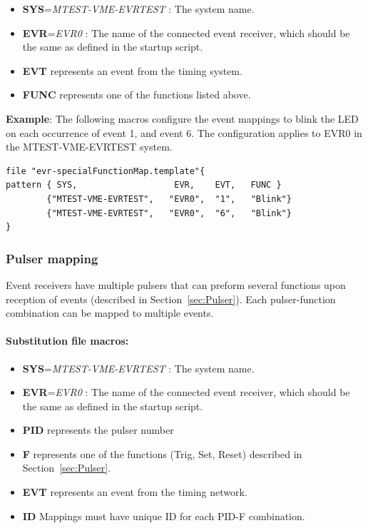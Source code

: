 \documentclass[12pt,a4paper]{article}
\begin{document}
\begin{itemize}
\item
	\textbf{SYS}=\emph{MTEST-VME-EVRTEST} : The system name. 
\item
	\textbf{EVR}=\emph{EVR0} : The name of the connected event receiver, which should be the same as defined in the startup script. 
\item
  \textbf{EVT} represents an event from the timing system.
\item
  \textbf{FUNC} represents one of the functions listed above.
\end{itemize}

\textbf{Example}: The following macros configure the event mappings to blink the LED on each occurrence of event 1, and event 6. The configuration applies to EVR0 in the MTEST-VME-EVRTEST system.

\begin{verbatim}
file "evr-specialFunctionMap.template"{
pattern { SYS,                   EVR,    EVT,   FUNC }
        {"MTEST-VME-EVRTEST",   "EVR0",  "1",   "Blink"}
        {"MTEST-VME-EVRTEST",   "EVR0",  "6",   "Blink"}
}
\end{verbatim}

\subsubsection{Pulser mapping}\label{sec:Pulser mapping}
Event receivers have multiple pulsers that can preform several functions upon reception of events (described in Section~\ref{sec:Pulser}). Each pulser-function combination can be
mapped to multiple events.

\paragraph{Substitution file macros:}
\begin{itemize}
\item
	\textbf{SYS}=\emph{MTEST-VME-EVRTEST} : The system name. 
\item
	\textbf{EVR}=\emph{EVR0} : The name of the connected event receiver, which should be the same as defined in the startup script.
\item
  \textbf{PID} represents the pulser number
\item
  \textbf{F} represents one of the functions (Trig, Set, Reset) described in Section~\ref{sec:Pulser}.
\item
  \textbf{EVT} represents an event from the timing network.
\item
  \textbf{ID} Mappings must have unique ID for each PID-F combination.
\end{itemize}
\end{document}
